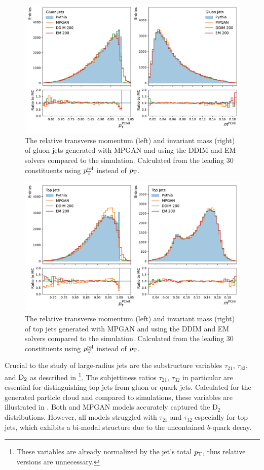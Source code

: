 \begin{figure}[hbpt]
    \centering
    \includegraphics[width=.75\textwidth]{Figures/jet_generation/jedi/gluon/jet_features_rel.pdf}
    \caption{The relative transverse momentum (left) and invariant mass (right) of gluon jets generated with MPGAN and \pcjedi using the DDIM and EM solvers compared to the \pythia simulation. Calculated from the leading 30 \pt constituents using $p_\mathrm{T}^\text{rel}$ instead of $p_\mathrm{T}$.}
    \label{fig:kinematics_gluon}
\end{figure}

\begin{figure}[hbpt]
    \centering
    \includegraphics[width=.75\textwidth]{Figures/jet_generation/jedi/top/jet_features_rel.pdf}
    \caption{The relative transverse momentum (left) and invariant mass (right) of top jets generated with MPGAN and \pcjedi using the DDIM and EM solvers compared to the \pythia simulation. Calculated from the leading 30 \pt constituents using $p_\mathrm{T}^\text{rel}$ instead of $p_\mathrm{T}$.}
    \label{fig:kinematics_top}
\end{figure}

Crucial to the study of large-radius jets are the substructure variables $\tau_{21}$, $\tau_{32}$, and $\text{D}_2$ as described in \footnote{These variables are already normalized by the jet's total $p_\mathrm{T}$, thus relative versions are unnecessary.}.
The subjettiness ratios $\tau_{21}$, $\tau_{32}$ in particular are essential for distinguishing top jets from gluon or quark jets.
Calculated for the generated particle cloud and compared to \pythia simulations, these variables are illustrated in .
Both \pcjedi and MPGAN models accurately captured the $\text{D}_2$ distributions.
However, all models struggled with $\tau_{21}$ and $\tau_{32}$ especially for top jets, which exhibits a bi-modal structure due to the uncontained $b$-quark decay.

